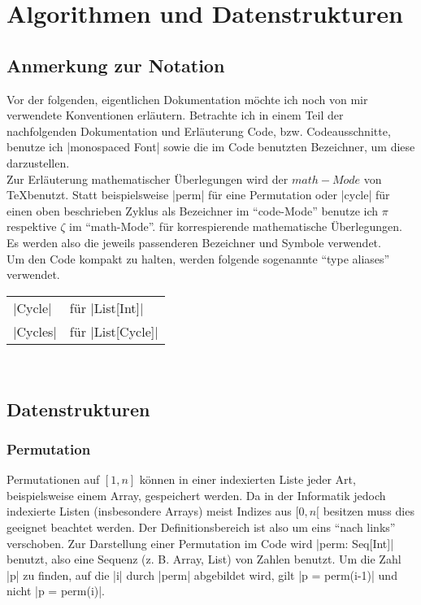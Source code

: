 \section{Algorithmen und Datenstrukturen}
\subsection{Anmerkung zur Notation}
Vor der folgenden, eigentlichen Dokumentation möchte ich noch von mir verwendete Konventionen erläutern.
Betrachte ich in einem Teil der nachfolgenden Dokumentation und Erläuterung Code, bzw. Codeausschnitte,
benutze ich |monospaced Font| sowie die im Code benutzten Bezeichner, um diese darzustellen. \\

Zur Erläuterung mathematischer Überlegungen wird der $math-Mode$ von \TeX benutzt.
Statt beispielsweise |perm| für eine Permutation oder |cycle| für einen oben beschrieben Zyklus als Bezeichner im ``code-Mode'' benutze ich $\pi$ respektive $\zeta$ im ``math-Mode''.
für korrespierende mathematische Überlegungen.
Es werden also die jeweils passenderen Bezeichner und Symbole verwendet.\\

Um den Code kompakt zu halten, werden folgende sogenannte ``type aliases'' verwendet. \\
\begin{tabular}{ll}
 |Cycle|  & für |List[Int]| \\
 |Cycles| & für |List[Cycle]| \\
\end{tabular} \\
\subsection{Datenstrukturen}
\subsubsection{Permutation}
Permutationen auf $[1,n]$ können in einer indexierten Liste jeder Art, beispielsweise einem Array, gespeichert werden.
Da in der Informatik jedoch indexierte Listen (insbesondere Arrays) meist Indizes aus $[0,n[$ besitzen muss dies geeignet beachtet werden.
Der Definitionsbereich ist also um eins ``nach links'' verschoben.
Zur Darstellung einer Permutation im Code wird |perm: Seq[Int]| benutzt, also eine Sequenz (z. B. Array, List) von Zahlen benutzt.
Um die Zahl |p| zu finden, auf die |i| durch |perm| abgebildet wird, gilt |p = perm(i-1)| und nicht |p = perm(i)|.
